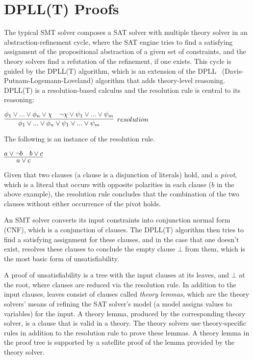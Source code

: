 \documentclass{article}
\begin{document}
\section{DPLL(T) Proofs}
\label{smtproofs}
	The typical SMT solver composes 
	a SAT solver with multiple theory
	solver in an abstraction-refinement
	cycle, where the SAT engine 
	tries to find a satisfying 
	assignment of the propositional
	abstraction of a given set of 
	constraints, and the theory
	solvers find a refutation of 
	the refinement, if one exists.
	This cycle is guided by the 
	DPLL(T) algorithm, which is an
	extension of the 
	DPLL~\cite{Loveland2016}
	(Davis-Putnam-Logemann-Loveland) 
	algorithm that adds theory-level 
	reasoning. DPLL(T) is a 
	resolution-based calculus and the 
	resolution rule is central to its 
	reasoning:
	\begin{center}
		$\infer[resolution]{\phi_1 \lor ... \lor 
			\phi_n \lor \psi_1 \lor ... \lor 
			\psi_m}{\phi_1 \lor ... \lor \phi_n 
			\lor \chi & \neg \chi \lor \psi_1 
			\lor ... \lor \psi_m}$ 
	\end{center}
	The following is an instance of the 
	resolution rule.
	\begin{center}
		$\infer{a \lor c}{a \lor \neg b 
			& b \lor c}$
	\end{center}
	Given that two clauses (a clause 
	is a disjunction of literals) hold, 
	and a \textit{pivot}, which is a 
	literal that occurs with opposite 
	polarities in each clause ($b$ in 
	the above example), the resolution 
	rule concludes that 
	the combination of the two clauses 
	without either occurrence of the 
	pivot holds.
	
	An SMT solver converts its input 
	constraints into conjunction 
	normal form (CNF), which is a 
	conjunction of clauses. The 
	DPLL(T) algorithm then tries 
	to find a satisfying assignment 
	for these clauses, and in the 
	case that one doesn't exist,
	resolves these clauses to 
	conclude the empty clause 
	$\bot$ from them, which is the 
	most basic form of unsatisfiability.
	
	A proof of unsatisfiability is 
	a tree with the input clauses at 
	its leaves, and $\bot$ at the 
	root, where clauses are reduced
	via the resolution rule. In 
	addition to the input clauses, 
	leaves consist of clauses 
	called \textit{theory lemmas}, 
	which are the theory solvers' 
	means of refining the SAT solver's
	model (a model assigns values 
	to variables) for the input. A
	theory lemma, produced by the 
	corresponding theory
	solver, is a clause that is
	valid in a theory. The theory 
	solvers use theory-specific 
	rules in addition to the 
	resolution rule to prove these 
	lemmas. A theory lemma in the 
	proof tree is supported by a 
	satellite proof of the lemma
	provided by the theory solver. 
	
\end{document}
